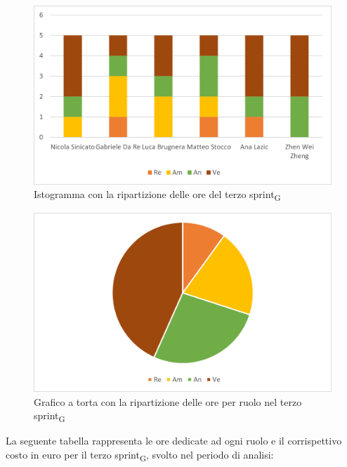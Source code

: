 \begin{figure}[H]
    \centering
    \includegraphics[scale=0.6]{img/grafi preventivo/istogrammi/analisi/sprint3.png}
    \caption{Istogramma con la ripartizione delle ore del terzo sprint\textsubscript{G}}
\end{figure}
\begin{figure}[H]
    \centering
    \includegraphics[scale=0.6]{img/grafi preventivo/torta/analisi/sprint3.png}
    \caption{Grafico a torta con la ripartizione delle ore per ruolo nel terzo sprint\textsubscript{G}}
\end{figure}
La seguente tabella rappresenta le ore dedicate ad ogni ruolo e il corrispettivo costo in euro per il terzo sprint\textsubscript{G}, svolto nel periodo di analisi:

